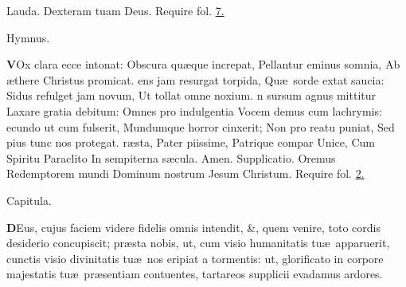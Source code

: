 \documentclass[letter,11pt]{book}
\begin{document}
\begin{multicols}{2}
\newline \color{Red} Lauda. \color{black} Dexteram tuam Deus. {\color{Red} Require fol.} \hyperlink{page.7}{7.}
\vspace{-.75em} \begin{center} \color{Red} Hymnus. \end{center} \vspace{-.75em}
\lettrine[lines=2]{\bfseries \color{Red} V}{}Ox clara ecce intonat:
\newline Obscura qu\ae que increpat,
\newline \indent Pellantur eminus somnia,
\newline \indent Ab \ae there Christus promicat.
ens jam resurgat torpida,
\newline \indent Qu\ae \ sorde extat saucia:
\newline \indent Sidus refulget jam novum,
\newline \indent Ut tollat omne noxium.
n sursum agnus mittitur
\newline \indent Laxare gratia debitum:
\newline \indent Omnes pro indulgentia
\newline \indent Vocem demus cum lachrymis:
ecundo ut cum fulserit,
\newline \indent Mundumque horror cinxerit;
\newline \indent Non pro reatu puniat,
\newline \indent Sed pius tunc nos protegat.
r\ae sta, Pater piissime,
\newline \indent Patrique compar Unice,
\newline \indent Cum Spiritu Paraclito
\newline \indent In sempiterna s\ae cula. Amen.
\newline \color{Red} Supplicatio. \color{black} Oremus Redemptorem mundi Dominum nostrum Jesum Christum. {\color{Red} Require fol.} \hyperlink{Supplicatio}{2.}
\vspace{-.75em} \begin{center} \color{Red} Capitula. \end{center} \vspace{-.75em}
\lettrine[lines=2]{\bfseries \color{Red} D}{}Eus, cujus faciem videre fidelis omnis intendit, \&, quem venire, toto cordis desiderio concupiscit; pr\ae sta nobis, ut, cum visio humanitatis tu\ae \ apparuerit, cunctis visio divinitatis tu\ae \ nos eripiat a tormentis: ut, glorificato in corpore majestatis tu\ae \ pr\ae sentiam contuentes, tartareos supplicii evadamus ardores.

\end{multicols}
\end{document}
